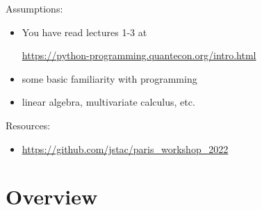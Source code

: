 \begin{frame}


    Assumptions:

    \begin{itemize}
        \item You have read lectures 1-3 at
            \begin{center}
                \url{https://python-programming.quantecon.org/intro.html}
            \end{center}
        \vspace{0.3em}
        \vspace{0.3em}
        \item some basic familiarity with programming
        \vspace{0.3em}
        \vspace{0.3em}
        \item linear algebra, multivariate calculus, etc.
    \end{itemize}

        \vspace{0.3em}
        \vspace{0.3em}
        \vspace{0.3em}
        \vspace{0.3em}
        \vspace{0.3em}
    Resources:

    \begin{itemize}
        \item \url{https://github.com/jstac/paris_workshop_2022}
    \end{itemize}


\end{frame}




\section{Overview}


